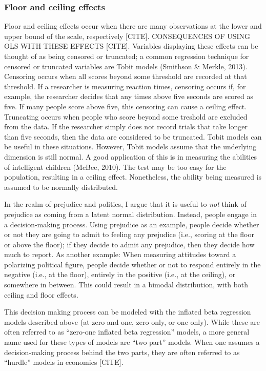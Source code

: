 \documentclass[english,man]{apa6}
\theoremstyle{definition}
\theoremstyle{definition}
\theoremstyle{remark}
\begin{document}
\subsubsection{Floor and ceiling
effects}\label{floor-and-ceiling-effects}

Floor and ceiling effects occur when there are many observations at the
lower and upper bound of the scale, respectively {[}CITE{]}.
CONSEQUENCES OF USING OLS WITH THESE EFFECTS {[}CITE{]}. Variables
displaying these effects can be thought of as being censored or
truncated; a common regression technique for censored or truncated
variables are Tobit models (Smithson \& Merkle, 2013). Censoring occurs
when all scores beyond some threshold are recorded at that threshold. If
a researcher is measuring reaction times, censoring occurs if, for
example, the researcher decides that any times above five seconds are
scored as five. If many people score above five, this censoring can
cause a ceiling effect. Truncating occurs when people who score beyond
some treshold are excluded from the data. If the researcher simply does
not record trials that take longer than five seconds, then the data are
considered to be truncated. Tobit models can be useful in these
situations. However, Tobit models assume that the underlying dimension
is still normal. A good application of this is in measuring the
abilities of intelligent children (McBee, 2010). The test may be too
easy for the population, resulting in a ceiling effect. Nonetheless, the
ability being measured is assumed to be normally distributed.

In the realm of prejudice and politics, I argue that it is useful to
\emph{not} think of prejudice as coming from a latent normal
distribution. Instead, people engage in a decision-making process. Using
prejudice as an example, people decide whether or not they are going to
admit to feeling any prejudice (i.e., scoring at the floor or above the
floor); if they decide to admit any prejudice, then they decide how much
to report. As another example: When measuring attitudes toward a
polarizing political figure, people decide whether or not to respond
entirely in the negative (i.e., at the floor), entirely in the positive
(i.e., at the ceiling), or somewhere in between. This could result in a
bimodal distribution, with both ceiling and floor effects.

This decision making process can be modeled with the inflated beta
regression models described above (at zero and one, zero only, or one
only). While these are often referred to as \enquote{zero-one inflated
beta regression} models, a more general name used for these types of
models are \enquote{two part} models. When one assumes a decision-making
process behind the two parts, they are often referred to as
\enquote{hurdle} models in economics {[}CITE{]}.
\end{document}

